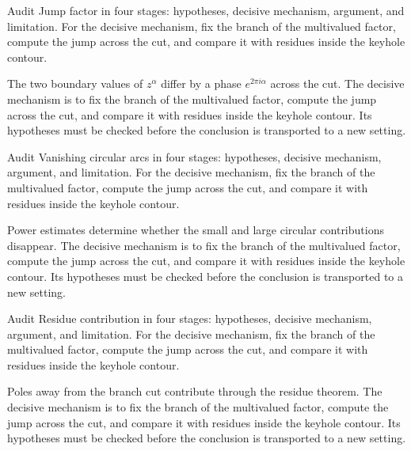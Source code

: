 \begin{problem}\label{prob:iv21-problem-03}
Audit Jump factor in four stages: hypotheses, decisive mechanism, argument, and limitation. For the decisive mechanism, fix the branch of the multivalued factor, compute the jump across the cut, and compare it with residues inside the keyhole contour.
\end{problem}
\begin{solution}
The two boundary values of $z^\alpha$ differ by a phase $e^{2\pi i\alpha}$ across the cut. The decisive mechanism is to fix the branch of the multivalued factor, compute the jump across the cut, and compare it with residues inside the keyhole contour. Its hypotheses must be checked before the conclusion is transported to a new setting.
\end{solution}

\begin{problem}\label{prob:iv21-problem-04}
Audit Vanishing circular arcs in four stages: hypotheses, decisive mechanism, argument, and limitation. For the decisive mechanism, fix the branch of the multivalued factor, compute the jump across the cut, and compare it with residues inside the keyhole contour.
\end{problem}
\begin{solution}
Power estimates determine whether the small and large circular contributions disappear. The decisive mechanism is to fix the branch of the multivalued factor, compute the jump across the cut, and compare it with residues inside the keyhole contour. Its hypotheses must be checked before the conclusion is transported to a new setting.
\end{solution}

\begin{problem}\label{prob:iv21-problem-05}
Audit Residue contribution in four stages: hypotheses, decisive mechanism, argument, and limitation. For the decisive mechanism, fix the branch of the multivalued factor, compute the jump across the cut, and compare it with residues inside the keyhole contour.
\end{problem}
\begin{solution}
Poles away from the branch cut contribute through the residue theorem. The decisive mechanism is to fix the branch of the multivalued factor, compute the jump across the cut, and compare it with residues inside the keyhole contour. Its hypotheses must be checked before the conclusion is transported to a new setting.
\end{solution}

